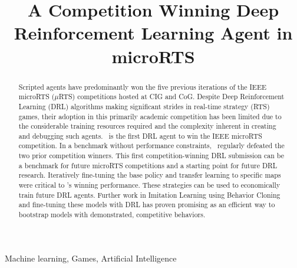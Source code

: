\documentclass[conference]{IEEEtran}
\begin{document}
\title{A Competition Winning Deep Reinforcement Learning Agent in microRTS}

\author{
    \IEEEauthorblockN{\authorName}
    \IEEEauthorblockA{\authorSecondary}
}

\maketitle

\begin{abstract}
Scripted agents have predominantly won the five
previous iterations of the IEEE microRTS ($\mu$RTS) competitions hosted at CIG and
CoG. Despite Deep Reinforcement Learning (DRL) algorithms making significant strides
in real-time strategy (RTS) games, their adoption in this primarily academic
competition has been limited  due to the considerable training resources required and the complexity
inherent in creating and debugging such agents. \agentName\ is the first DRL agent
to win the IEEE microRTS competition. In a benchmark without performance
constraints, \agentName\ regularly defeated the two
prior competition winners. This first competition-winning DRL submission can be
a benchmark for future microRTS competitions and a starting point for future DRL
research. Iteratively fine-tuning the base policy and transfer learning to specific maps were 
critical to \agentName's winning performance. These strategies can be used to
economically train future DRL agents. Further work in Imitation Learning using Behavior Cloning and
fine-tuning these models with DRL has proven promising as an efficient way
to bootstrap models with demonstrated, competitive behaviors.
\end{abstract}

\begin{IEEEkeywords}
    Machine learning, Games, Artificial Intelligence
\end{IEEEkeywords}
\end{document}
